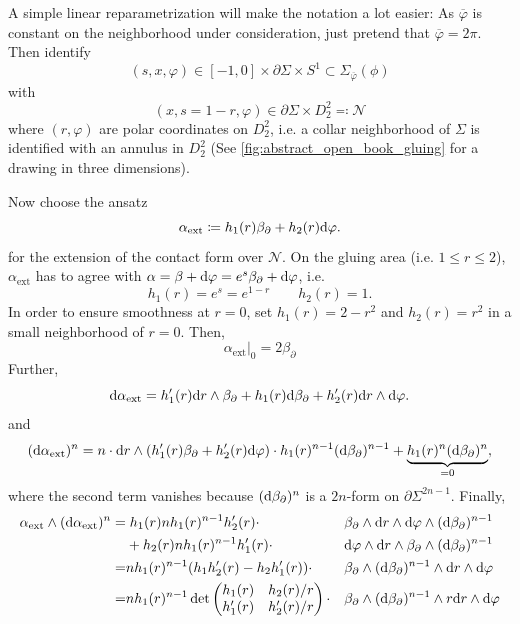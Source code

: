 A simple linear reparametrization will make the notation a lot easier: As $\overline{\varphi}$ is constant on the neighborhood under consideration, just pretend that $\overline{\varphi} = 2\pi$.
Then identify 
\[
    (s, x, \varphi) \in [-1,0] \times \partial \Sigma \times S^1 \subset \Sigma_{\overline{\varphi}}(\phi)
\]
with
\[
    (x, s = 1-r, \varphi) \in \partial \Sigma \times D_2^2 \eqqcolon \mathcal{N}
\]
where $(r, \varphi)$ are polar coordinates on $D_2^2$, i.e. a collar neighborhood of $\Sigma$ is identified with an annulus in $D_2^2$
(See \cref{fig:abstract_open_book_gluing} for a drawing in three dimensions).

Now choose the ansatz
\[
    \alpha_\text{ext} \coloneqq h_1(r) \beta_\partial + h_2(r) \mathrm{d}\varphi.
\]
for the extension of the contact form over $\mathcal{N}$.
On the gluing area (i.e. $1 \le r \le 2$), $\alpha_\text{ext}$ has to agree with $\alpha = \beta + \mathrm{d} \varphi = e^s \beta_\partial + \mathrm{d} \varphi$,
i.e.
\[
    h_1(r) = e^s = e^{1-r} \qquad h_2(r) = 1.
\]
In order to ensure smoothness at $r=0$, set $h_1(r) = 2 - r^2$ and $h_2(r) = r^2$ in a small neighborhood of $r = 0$. Then,
\[
    \alpha_\text{ext}|_0 = 2\beta_\partial
\]
Further,
\[
    \mathrm{d} \alpha_\text{ext} = h_1'(r)\mathrm{d} r\wedge \beta_\partial + h_1(r) \mathrm{d} \beta_\partial + h_2'(r) \mathrm{d} r \wedge \mathrm{d}\varphi.
\]
and
\[
    (\mathrm{d} \alpha_\text{ext})^n = n\cdot \mathrm{d} r\wedge (h_1'(r) \beta_\partial + h_2'(r) \mathrm{d}\varphi) \cdot h_1(r)^{n-1}(\mathrm{d} \beta_\partial)^{n-1} + \underbrace{h_1(r)^n (\mathrm{d} \beta_\partial)^n}_{=0},
\]
where the second term vanishes because $(\mathrm{d} \beta_\partial)^n$ is a $2n$-form on $\partial \Sigma^{2n-1}$.
Finally,
\begin{align*}
    \alpha_\text{ext} \wedge (\mathrm{d} \alpha_\text{ext})^n =& \;h_1(r)n h_1(r)^{n-1} h_2'(r) \cdot&&\beta_\partial \wedge \mathrm{d} r \wedge \mathrm{d} \varphi \wedge (\mathrm{d}\beta_\partial)^{n-1}\\
    &+ h_2(r)n h_1(r)^{n-1}h_1'(r) \cdot&&\mathrm{d} \varphi \wedge \mathrm{d} r \wedge \beta_\partial \wedge (\mathrm{d}\beta_\partial)^{n-1}\\
    =& n h_1(r)^{n-1}(h_1h_2'(r) - h_2h_1'(r)) \cdot &&\beta_\partial \wedge (\mathrm{d}\beta_\partial)^{n-1} \wedge \mathrm{d} r \wedge \mathrm{d} \varphi\\
    =& n h_1(r)^{n-1}\det \begin{pmatrix}
        h_1(r) & h_2(r)/r\\
        h_1'(r) & h_2'(r)/r
    \end{pmatrix} \cdot &&\beta_\partial \wedge (\mathrm{d}\beta_\partial)^{n-1} \wedge r \mathrm{d} r \wedge \mathrm{d} \varphi\\
\end{align*}

